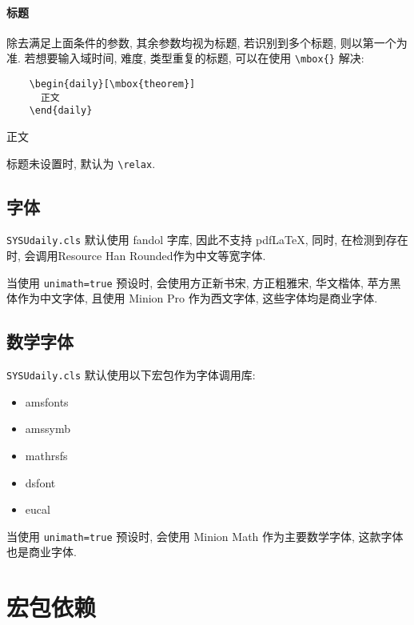 \documentclass{SYSUDaily}
\begin{document}
\paragraph{标题}
除去满足上面条件的参数, 其余参数均视为标题, 若识别到多个标题, 则以第一个为准.
若想要输入域时间, 难度, 类型重复的标题, 可以在使用 \verb|\mbox{}| 解决:
\begin{multicols}{2}
	\begin{lstlisting}
    \begin{daily}[\mbox{theorem}]
      正文
    \end{daily}
  \end{lstlisting}
	\small
	\begin{daily}
		正文
	\end{daily}
\end{multicols}
标题未设置时, 默认为 \verb|\relax|.

\subsection{字体}
\verb|SYSUdaily.cls| 默认使用 \textsf{fandol} 字库, 因此不支持 pdf\LaTeX{}, 同时,
在检测到存在时, 会调用Resource Han Rounded作为中文等宽字体.

当使用 \verb|unimath=true| 预设时, 会使用方正新书宋, 方正粗雅宋, 华文楷体, 苹方黑体作为中文字体, 且使用 Minion Pro 作为西文字体, 这些字体均是商业字体.

\subsection{数学字体}
\label{ssec:math_fonts}
\verb|SYSUdaily.cls| 默认使用以下宏包作为字体调用库:
\begin{itemize}[parsep=0pt,itemsep=0pt]
	\item
			\textsf{amsfonts}
	\item
			\textsf{amssymb}
	\item
			\textsf{mathrsfs}
	\item
			\textsf{dsfont}
	\item
			\textsf{eucal}
\end{itemize}
当使用 \verb|unimath=true| 预设时, 会使用 Minion Math 作为主要数学字体, 这款字体也是商业字体.

\section{宏包依赖}
\end{document}
